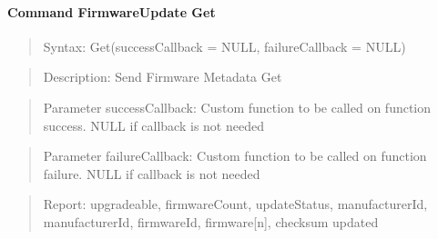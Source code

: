 \paragraph{Command FirmwareUpdate Get}
\begin{quote}Syntax: Get(successCallback = NULL, failureCallback = NULL)\end{quote}
\begin{quote}Description: Send Firmware Metadata Get\end{quote}
\begin{quote}Parameter successCallback: Custom function to be called on function success. NULL if callback is not needed\end{quote}
\begin{quote}Parameter failureCallback: Custom function to be called on function failure. NULL if callback is not needed\end{quote}
\begin{quote}Report: upgradeable, firmwareCount, updateStatus, manufacturerId, manufacturerId, firmwareId, firmware[n], checksum updated\end{quote}

